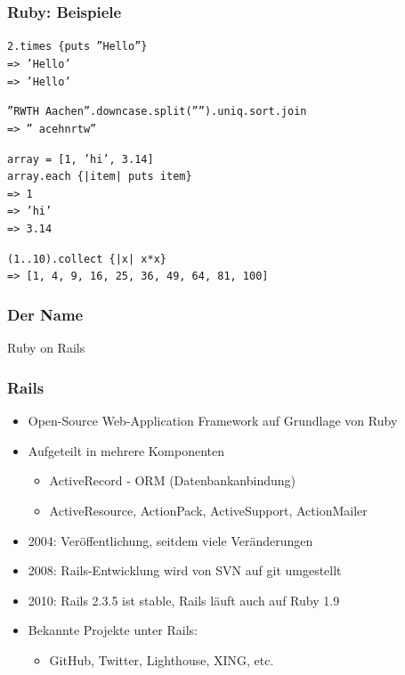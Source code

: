 \begin{frame}
  \frametitle{Ruby: Beispiele}
  {\tt \small 2.times \{puts ''Hello''\}} \\
  {\tt \small {\color{green}=> 'Hello'}} \\
  {\tt \small {\color{green}=> 'Hello'}}
  \vspace{0.5cm}
  \pause

  {\tt \small ''RWTH Aachen''.downcase.split('''').uniq.sort.join} \\
  {\tt \small  {\color{green}=> '' acehnrtw''}} \\
  \vspace{0.5cm}
  \pause

  {\tt \small array = [1, 'hi', 3.14]} \\
  {\tt \small array.each \{|item| puts item\}} \\
  {\tt \small {\color{green}=> 1}} \\
  {\tt \small {\color{green}=> 'hi'}} \\
  {\tt \small {\color{green}=> 3.14}}
  \vspace{0.5cm}
  \pause

  {\tt \small (1..10).collect \{|x| x*x\}} \\
  {\tt \small {\color{green}=> [1, 4, 9, 16, 25, 36, 49, 64, 81, 100]}}
\end{frame}

\begin{frame}
  \frametitle{Der Name}
  \begin{center}
    \Huge Ruby {\color{red}on Rails}
  \end{center}
\end{frame}

\begin{frame}
  \frametitle{Rails}
  \begin{itemize}
    \item{Open-Source Web-Application Framework auf Grundlage von Ruby}
    \item{Aufgeteilt in mehrere Komponenten}
    \begin{itemize}
      \item{ActiveRecord - ORM (Datenbankanbindung)}
      \item{ActiveResource, ActionPack, ActiveSupport, ActionMailer}
    \end{itemize}
    \vspace{0.3cm}

    \item{2004: Veröffentlichung, seitdem viele Veränderungen}
    \item{2008: Rails-Entwicklung wird von SVN auf git umgestellt}
    \item{2010: Rails 2.3.5 ist stable, Rails läuft auch auf Ruby 1.9}
    \vspace{0.3cm}

    \item{Bekannte Projekte unter Rails:}
    \begin{itemize}
      \item{GitHub, Twitter, Lighthouse, XING, etc.}
    \end{itemize}
  \end{itemize}
\end{frame}

